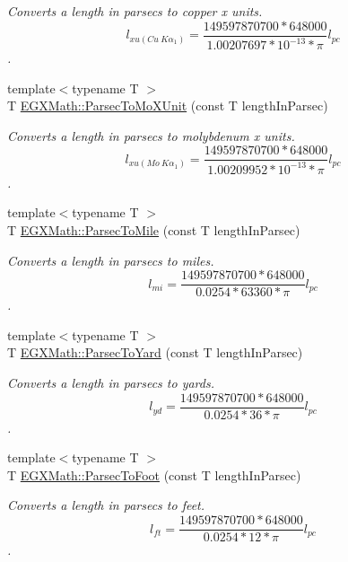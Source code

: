 \begin{DoxyCompactItemize}
\begin{DoxyCompactList}\small\item\em Converts a length in parsecs to copper x units. \[ l_{xu(Cu\ K\alpha_1)}= \frac{149597870700 * 648000}{1.00207697*10^{-13} * \pi} l_{pc}\]. \end{DoxyCompactList}\item 
{\footnotesize template$<$typename T $>$ }\\T \mbox{\hyperlink{group___e_g_x_math-_conversions-_length_conversions-_astronomical-_parsec-_non-_s_i_gaf076c4eb125bbc9fbabc040300961b6d}{E\+G\+X\+Math\+::\+Parsec\+To\+Mo\+X\+Unit}} (const T length\+In\+Parsec)
\begin{DoxyCompactList}\small\item\em Converts a length in parsecs to molybdenum x units. \[ l_{xu(Mo\ K\alpha_1)}=\frac{149597870700 * 648000}{1.00209952*10^{-13}* \pi} l_{pc}\]. \end{DoxyCompactList}\item 
{\footnotesize template$<$typename T $>$ }\\T \mbox{\hyperlink{group___e_g_x_math-_conversions-_length_conversions-_astronomical-_parsec-_imperial_gaff2c298a0830dd20dc3acce2d9d789f8}{E\+G\+X\+Math\+::\+Parsec\+To\+Mile}} (const T length\+In\+Parsec)
\begin{DoxyCompactList}\small\item\em Converts a length in parsecs to miles. \[ l_{mi}=\frac{149597870700 * 648000}{ 0.0254 * 63360 * \pi} l_{pc} \]. \end{DoxyCompactList}\item 
{\footnotesize template$<$typename T $>$ }\\T \mbox{\hyperlink{group___e_g_x_math-_conversions-_length_conversions-_astronomical-_parsec-_imperial_gae9ae73b70979fb012736516147854cf4}{E\+G\+X\+Math\+::\+Parsec\+To\+Yard}} (const T length\+In\+Parsec)
\begin{DoxyCompactList}\small\item\em Converts a length in parsecs to yards. \[ l_{yd}= \frac{149597870700 * 648000}{0.0254 * 36 * \pi} l_{pc} \]. \end{DoxyCompactList}\item 
{\footnotesize template$<$typename T $>$ }\\T \mbox{\hyperlink{group___e_g_x_math-_conversions-_length_conversions-_astronomical-_parsec-_imperial_ga2c9e8ada868b6915660db313612ac550}{E\+G\+X\+Math\+::\+Parsec\+To\+Foot}} (const T length\+In\+Parsec)
\begin{DoxyCompactList}\small\item\em Converts a length in parsecs to feet. \[ l_{ft}= \frac{149597870700 * 648000}{0.0254 * 12 * \pi} l_{pc} \]. \end{DoxyCompactList}\item 

\end{DoxyCompactItemize}
